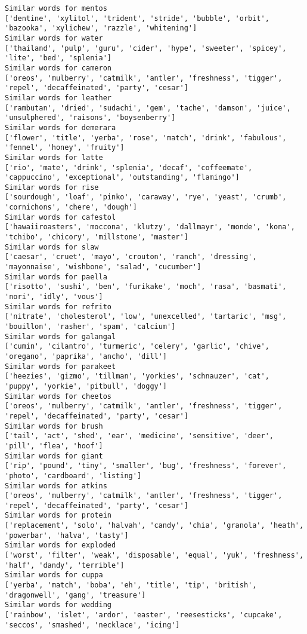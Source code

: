 \documentclass[11pt]{article}
\begin{document}
\begin{Verbatim}[commandchars=\\\{\}]
Similar words for mentos
['dentine', 'xylitol', 'trident', 'stride', 'bubble', 'orbit', 'bazooka', 'xylichew', 'razzle', 'whitening']
Similar words for water
['thailand', 'pulp', 'guru', 'cider', 'hype', 'sweeter', 'spicey', 'lite', 'bed', 'splenia']
Similar words for cameron
['oreos', 'mulberry', 'catmilk', 'antler', 'freshness', 'tigger', 'repel', 'decaffeinated', 'party', 'cesar']
Similar words for leather
['rambutan', 'dried', 'sudachi', 'gem', 'tache', 'damson', 'juice', 'unsulphered', 'raisons', 'boysenberry']
Similar words for demerara
['flower', 'title', 'yerba', 'rose', 'match', 'drink', 'fabulous', 'fennel', 'honey', 'fruity']
Similar words for latte
['rio', 'mate', 'drink', 'splenia', 'decaf', 'coffeemate', 'cappuccino', 'exceptional', 'outstanding', 'flamingo']
Similar words for rise
['sourdough', 'loaf', 'pinko', 'caraway', 'rye', 'yeast', 'crumb', 'cornichons', 'chere', 'dough']
Similar words for cafestol
['hawaiiroasters', 'moccona', 'klutzy', 'dallmayr', 'monde', 'kona', 'tchibo', 'chicory', 'millstone', 'master']
Similar words for slaw
['caesar', 'cruet', 'mayo', 'crouton', 'ranch', 'dressing', 'mayonnaise', 'wishbone', 'salad', 'cucumber']
Similar words for paella
['risotto', 'sushi', 'ben', 'furikake', 'moch', 'rasa', 'basmati', 'nori', 'idly', 'vous']
Similar words for refrito
['nitrate', 'cholesterol', 'low', 'unexcelled', 'tartaric', 'msg', 'bouillon', 'rasher', 'spam', 'calcium']
Similar words for galangal
['cumin', 'cilantro', 'turmeric', 'celery', 'garlic', 'chive', 'oregano', 'paprika', 'ancho', 'dill']
Similar words for parakeet
['heezies', 'gizmo', 'tillman', 'yorkies', 'schnauzer', 'cat', 'puppy', 'yorkie', 'pitbull', 'doggy']
Similar words for cheetos
['oreos', 'mulberry', 'catmilk', 'antler', 'freshness', 'tigger', 'repel', 'decaffeinated', 'party', 'cesar']
Similar words for brush
['tail', 'act', 'shed', 'ear', 'medicine', 'sensitive', 'deer', 'pill', 'flea', 'hoof']
Similar words for giant
['rip', 'pound', 'tiny', 'smaller', 'bug', 'freshness', 'forever', 'photo', 'cardboard', 'listing']
Similar words for atkins
['oreos', 'mulberry', 'catmilk', 'antler', 'freshness', 'tigger', 'repel', 'decaffeinated', 'party', 'cesar']
Similar words for protein
['replacement', 'solo', 'halvah', 'candy', 'chia', 'granola', 'heath', 'powerbar', 'halva', 'tasty']
Similar words for exploded
['worst', 'filter', 'weak', 'disposable', 'equal', 'yuk', 'freshness', 'half', 'dandy', 'terrible']
Similar words for cuppa
['yerba', 'match', 'boba', 'eh', 'title', 'tip', 'british', 'dragonwell', 'gang', 'treasure']
Similar words for wedding
['rainbow', 'islet', 'ardor', 'easter', 'reesesticks', 'cupcake', 'seccos', 'smashed', 'necklace', 'icing']

\end{Verbatim}
\end{document}

